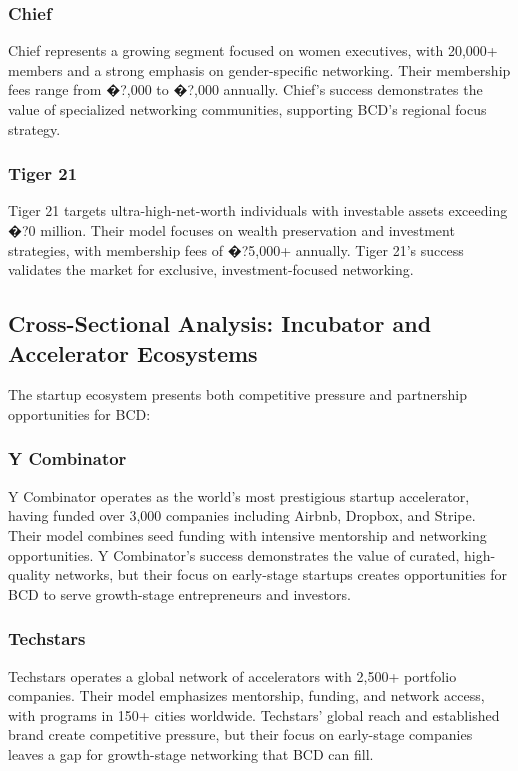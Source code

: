 \subsubsection{Chief}
Chief represents a growing segment focused on women executives, with 20,000+ members and a strong emphasis on gender-specific networking. Their membership fees range from �?,000 to �?,000 annually. Chief's success demonstrates the value of specialized networking communities, supporting BCD's regional focus strategy.

\subsubsection{Tiger 21}
Tiger 21 targets ultra-high-net-worth individuals with investable assets exceeding �?0 million. Their model focuses on wealth preservation and investment strategies, with membership fees of �?5,000+ annually. Tiger 21's success validates the market for exclusive, investment-focused networking.

\subsection{Cross-Sectional Analysis: Incubator and Accelerator Ecosystems}

The startup ecosystem presents both competitive pressure and partnership opportunities for BCD:

\subsubsection{Y Combinator}
Y Combinator operates as the world's most prestigious startup accelerator, having funded over 3,000 companies including Airbnb, Dropbox, and Stripe. Their model combines seed funding with intensive mentorship and networking opportunities. Y Combinator's success demonstrates the value of curated, high-quality networks, but their focus on early-stage startups creates opportunities for BCD to serve growth-stage entrepreneurs and investors.

\subsubsection{Techstars}
Techstars operates a global network of accelerators with 2,500+ portfolio companies. Their model emphasizes mentorship, funding, and network access, with programs in 150+ cities worldwide. Techstars' global reach and established brand create competitive pressure, but their focus on early-stage companies leaves a gap for growth-stage networking that BCD can fill.

